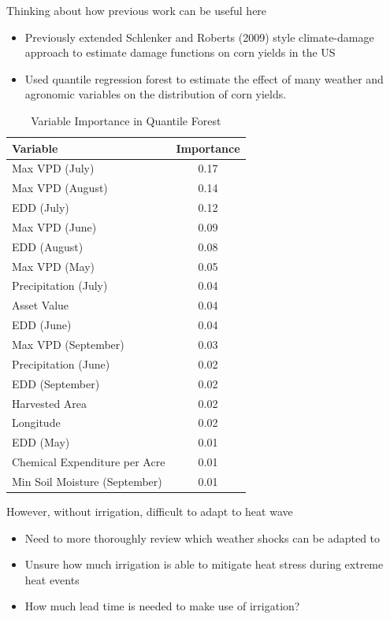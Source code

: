 \documentclass[aspectratio=169, xcolor=dvipsnames]{beamer}
\begin{document}
\begin{frame}{Thinking about how previous work can be useful here}
    \begin{itemize}
        \item Previously extended Schlenker and Roberts (2009) style climate-damage approach to estimate damage functions on corn yields in the US
        \item Used quantile regression forest to estimate the effect of many weather and agronomic variables on the distribution of corn yields. 
    \end{itemize}
    \begin{table}[htbp]
\centering
\caption{Variable Importance in Quantile Forest} 
\label{tab:variable_importance}
\begin{tabular}{p{5cm}c}
  \hline
Variable & Importance \\ 
  \hline
Max VPD (July) & 0.17 \\ 
  Max VPD (August) & 0.14 \\ 
  EDD (July) & 0.12 \\ 
  Max VPD (June) & 0.09 \\ 
  EDD (August) & 0.08 \\ 
  Max VPD (May) & 0.05 \\ 
  Precipitation (July) & 0.04 \\ 
  Asset Value & 0.04 \\ 
  EDD (June) & 0.04 \\ 
  Max VPD (September) & 0.03 \\ 
  Precipitation (June) & 0.02 \\ 
  EDD (September) & 0.02 \\ 
  Harvested Area & 0.02 \\ 
  Longitude & 0.02 \\ 
  EDD (May) & 0.01 \\ 
  Chemical Expenditure per Acre & 0.01 \\ 
  Min Soil Moisture (September) & 0.01 \\ 
   \hline
\end{tabular}
\end{table}
\end{frame}

\begin{frame}{However, without irrigation, difficult to adapt to heat wave}
    \begin{itemize}
        \item Need to more thoroughly review which weather shocks can be adapted to
        \item Unsure how much irrigation is able to mitigate heat stress during extreme heat events
        \item How much lead time is needed to make use of irrigation? 
    \end{itemize}
\end{frame}
\end{document}
